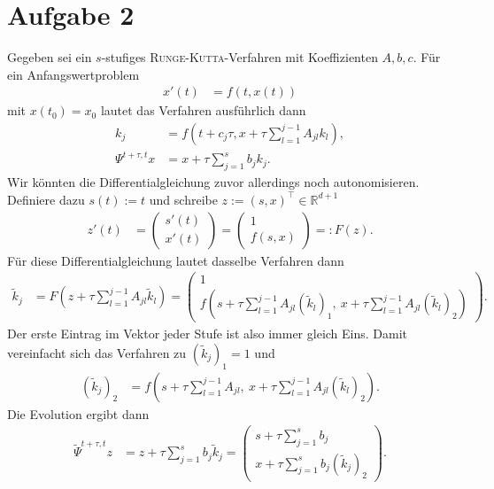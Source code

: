 \documentclass[english, parskip=full]{scrartcl}
\newcommand{\kla}{}
\begin{document}
\section*{Aufgabe 2}
Gegeben sei ein $s$-stufiges \textsc{Runge-Kutta}-Verfahren mit Koeffizienten $A,b,c$.
Für ein Anfangswertproblem
\begin{align}
x'(t) &= f(t,x(t))
\end{align}
mit $x(t_0) = x_0$ lautet das Verfahren ausführlich dann
\begin{align}
k_j &= f\kla\left( t + c_j\tau, x + \tau\sum_{l=1}^{j-1} A_{jl}k_l \right),\\
\Psi^{t+\tau,t}x &= x + \tau \sum_{j=1}^s b_jk_j.
\end{align}
Wir könnten die Differentialgleichung zuvor allerdings noch autonomisieren.
Definiere dazu $s(t) := t$ und schreibe $z := (s,x)^\top \in\mathbb{R}^{d+1}$
\begin{align}
z'(t) &= \begin{pmatrix}
s'(t) \\ x'(t)
\end{pmatrix} = \begin{pmatrix}
1 \\ f(s,x)
\end{pmatrix} =: F(z).
\end{align}
Für diese Differentialgleichung lautet dasselbe Verfahren dann
\begin{align}
\tilde{k}_j &= F\kla\left( z + \tau\sum_{l=1}^{j-1} A_{jl} \tilde{k}_l \right) = \begin{pmatrix}
1 \\ f\kla\left( s + \tau\sum_{l=1}^{j-1} A_{jl} (\tilde{k}_l)_1,\ x + \tau \sum_{l=1}^{j-1} A_{jl} (\tilde{k}_l)_2 \right)
\end{pmatrix}.
\end{align}
Der erste Eintrag im Vektor jeder Stufe ist also immer gleich Eins.
Damit vereinfacht sich das Verfahren zu $(\tilde{k}_j)_1 = 1$ und
\begin{align}
(\tilde{k}_j)_2 &= f\kla\left( s + \tau\sum_{l=1}^{j-1} A_{jl},\ x + \tau \sum_{l=1}^{j-1} A_{jl} (\tilde{k}_l)_2 \right).
\end{align}
Die Evolution ergibt dann
\begin{align}
\tilde{\Psi}^{t+\tau,t}z &= z + \tau \sum_{j=1}^s b_j\tilde{k}_j = \begin{pmatrix}
s + \tau \sum_{j=1}^s b_j \\ x + \tau \sum_{j=1}^s b_j (\tilde{k}_j)_2
\end{pmatrix}.
\end{align}
\end{document}
